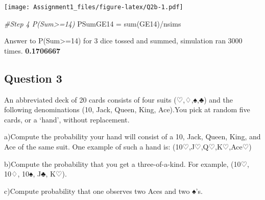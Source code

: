 \documentclass[
]{article}
\newenvironment{Shaded}{\begin{snugshade}}{\end{snugshade}}
\newcommand{\CommentTok}[1]{\textcolor[rgb]{0.56,0.35,0.01}{\textit{#1}}}
\newcommand{\FunctionTok}[1]{\textcolor[rgb]{0.00,0.00,0.00}{#1}}
\newcommand{\NormalTok}[1]{#1}
\newcommand{\OtherTok}[1]{\textcolor[rgb]{0.56,0.35,0.01}{#1}}
\newcommand{\SpecialCharTok}[1]{\textcolor[rgb]{0.00,0.00,0.00}{#1}}
\begin{document}
\texttt{[image: Assignment1\_files/figure-latex/Q2b-1.pdf]}

\begin{Shaded}
\begin{Highlighting}[]
\CommentTok{\#Step 4 P(Sum\textgreater{}=14)}
\NormalTok{PSumGE14 }\OtherTok{=} \FunctionTok{sum}\NormalTok{(GE14)}\SpecialCharTok{/}\NormalTok{nsims}
\end{Highlighting}
\end{Shaded}

Answer to P(Sum\textgreater=14) for 3 dice tossed and summed, simulation
ran 3000 times. \textbf{0.1706667}

\hypertarget{question-3}{%
\subsection{Question 3}\label{question-3}}

An abbreviated deck of 20 cards consists of four suits (♡,♢,♠,♣) and the
following denominations (10, Jack, Queen, King, Ace).You pick at random
five cards, or a `hand', without replacement.

a)Compute the probability your hand will consist of a 10, Jack, Queen,
King, and Ace of the same suit. One example of such a hand is:
(10♡,J♡,Q♡,K♡,Ace♡)

b)Compute the probability that you get a three-of-a-kind. For example,
(10♡, 10♢, 10♠, J♣, K♡).

c)Compute probability that one observes two Aces and two ♠'s.
\end{document}
